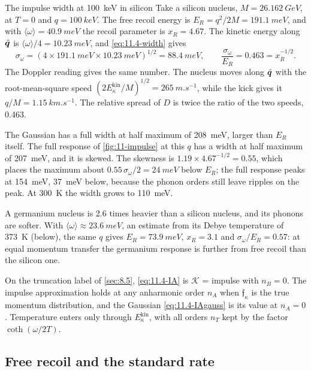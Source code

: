 \begin{workedexample}{The impulse width at \SI{100}{keV} in silicon}\label{we:11-width}
Take a silicon nucleus, $M = \SI{26.162}{GeV}$, at $T = 0$ and $q = \SI{100}{keV}$. The free recoil energy is $E_R = q^2/2M = \SI{191.1}{meV}$, and with $\langle\omega\rangle = \SI{40.9}{meV}$ the recoil parameter is $x_R = 4.67$. The kinetic energy along $\hat{\bm{q}}$ is $\langle\omega\rangle/4 = \SI{10.23}{meV}$, and \cref{eq:11.4-width} gives
\begin{equation*}
  \sigma_\omega = (4 \times \SI{191.1}{meV} \times \SI{10.23}{meV})^{1/2} = \SI{88.4}{meV} , \qquad \frac{\sigma_\omega}{E_R} = 0.463 = x_R^{-1/2} .
\end{equation*}
The Doppler reading gives the same number. The nucleus moves along $\hat{\bm{q}}$ with the root-mean-square speed $(2E^{\mathrm{kin}}_\kappa/M)^{1/2} = \SI{265}{m.s^{-1}}$, while the kick gives it $q/M = \SI{1.15}{km.s^{-1}}$. The relative spread of $D$ is twice the ratio of the two speeds, 0.463.

The Gaussian has a full width at half maximum of \SI{208}{meV}, larger than $E_R$ itself. The full response of \cref{fig:11-impulse} at this $q$ has a width at half maximum of \SI{207}{meV}, and it is skewed. The skewness is $1.19 \times 4.67^{-1/2} = 0.55$, which places the maximum about $0.55\,\sigma_\omega/2 = \SI{24}{meV}$ below $E_R$; the full response peaks at \SI{154}{meV}, \SI{37}{meV} below, because the phonon orders still leave ripples on the peak. At \SI{300}{K} the width grows to \SI{110}{meV}.

A germanium nucleus is 2.6 times heavier than a silicon nucleus, and its phonons are softer. With $\langle\omega\rangle \approx \SI{23.6}{meV}$, an estimate from its Debye temperature of \SI{373}{K} (below), the same $q$ gives $E_R = \SI{73.9}{meV}$, $x_R = 3.1$ and $\sigma_\omega/E_R = 0.57$: at equal momentum transfer the germanium response is further from free recoil than the silicon one.
\end{workedexample}

On the truncation label of \cref{sec:8.5}, \cref{eq:11.4-IA} is $\mathcal{K}$ = impulse with $n_B = 0$. The impulse approximation holds at any anharmonic order $n_A$ when $\mathfrak{f}_\kappa$ is the true momentum distribution, and the Gaussian \cref{eq:11.4-IAgauss} is its value at $n_A = 0$. Temperature enters only through $E^{\mathrm{kin}}_\kappa$, with all orders $n_T$ kept by the factor $\coth(\omega/2T)$.

\subsection{Free recoil and the standard rate}

